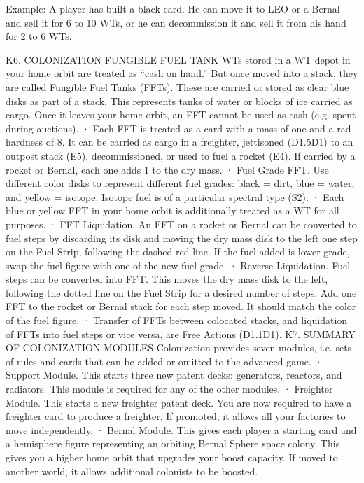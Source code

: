 \documentclass[a4paper]{book}
\begin{document}
Example: A player has built a black card. He can move it to LEO or a Bernal and sell it for 6 to 10 WTs, or he can decommission it and sell it from his hand for 2 to 6 WTs.
 
K6. COLONIZATION FUNGIBLE FUEL TANK
WTs stored in a WT depot in your home orbit are treated as “cash on hand.” But once moved into a stack, they are called Fungible Fuel Tanks (FFTs). These are carried or stored as clear blue disks as part of a stack. This represents tanks of water or blocks of ice carried as cargo. Once it leaves your home orbit, an FFT cannot be used as cash (e.g. spent during auctions).
·       Each FFT is treated as a card with a mass of one and a rad-hardness of 8. It can be carried as cargo in a freighter, jettisoned (D1.5D1) to an outpost stack (E5), decommissioned, or used to fuel a rocket (E4). If carried by a rocket or Bernal, each one adds 1 to the dry mass.
·   	Fuel Grade FFT. Use different color disks to represent different fuel grades: black = dirt, blue = water, and yellow = isotope. Isotope fuel is of a particular spectral type (S2).
·       Each blue or yellow FFT in your home orbit is additionally treated as a WT for all purposes.
·       FFT Liquidation. An FFT on a rocket or Bernal can be converted to fuel steps by discarding its disk and moving the dry mass disk to the left one step on the Fuel Strip, following the dashed red line. If the fuel added is lower grade, swap the fuel figure with one of the new fuel grade.
·       Reverse-Liquidation. Fuel steps can be converted into FFT. This moves the dry mass disk to the left, following the dotted line on the Fuel Strip for a desired number of steps. Add one FFT to the rocket or Bernal stack for each step moved. It should match the color of the fuel figure.
·       Transfer of FFTs between colocated stacks, and liquidation of FFTs into fuel steps or vice versa, are Free Actions (D1.1D1).
K7. SUMMARY OF COLONIZATION MODULES
Colonization provides seven modules, i.e. sets of rules and cards that can be added or omitted to the advanced game.
·       Support Module. This starts three new patent decks: generators, reactors, and radiators. This module is required for any of the other modules.
·       Freighter Module. This starts a new freighter patent deck. You are now required to have a freighter card to produce a freighter. If promoted, it allows all your factories to move independently.
·       Bernal Module. This gives each player a starting card and a hemisphere figure representing an orbiting Bernal Sphere space colony. This gives you a higher home orbit that upgrades your boost capacity. If moved to another world, it allows additional colonists to be boosted.
\end{document}
